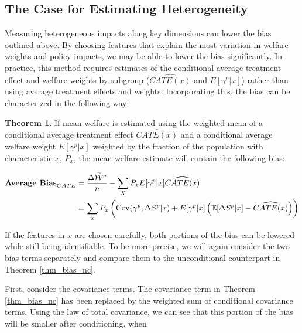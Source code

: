 \documentclass[12pt]{article}
\theoremstyle{definition}
\theoremstyle{definition}
\theoremstyle{definition}
\theoremstyle{definition}
\newtheorem{thm}{Theorem}
\begin{document}


\subsection{The Case for Estimating Heterogeneity}

 Measuring heterogeneous impacts along key dimensions can lower the bias outlined above. By choosing features that explain the most variation in welfare weights and policy impacts, we may be able to lower the bias significantly. In practice, this method requires estimates of the conditional average treatment effect and welfare weights by subgroup ($\widehat{CATE(x)}$ and $E[\gamma^p|x]$) rather than using average treatment effects and weights. Incorporating this, the bias can be characterized in the following way:

    \begin{thm}
    \label{thm_cond_bias}
       If mean welfare is estimated using the weighted mean of a conditional average treatment effect $\widehat{CATE(x)}$ and a conditional average welfare weight $E[\gamma^p|x]$ weighted by the fraction of the population with characteristic $x$, $P_x$,  the mean welfare estimate will contain the following bias: 
        
        \begin{align*}
        \textbf{Average Bias}_{CATE} &= \frac{\Delta \accentset{\sim}{\mathcal{W}}^p}{n} -  \sum_{X} P_x E[\gamma^p|x] \widehat{CATE(x)}  \\
       & = \sum_{x} P_x \left( \mathrm{Cov}(\gamma^p, \Delta S^p| x) + E[\gamma^p|x] \left( \mathbb{E}[\Delta S^p|x]-\widehat{CATE(x)} \right)\right)
    \end{align*}
    \end{thm}

    If the features in $x$ are chosen carefully, both portions of the bias can be lowered while still being identifiable. To be more precise, we will again consider the two bias terms separately and compare them to the unconditional counterpart in Theorem \ref{thm_bias_nc}. 

    First, consider the covariance terms. The covariance term in Theorem \ref{thm_bias_nc} has been replaced by the weighted sum of conditional covariance terms. Using the law of total covariance, we can see that this portion of the bias will be smaller after conditioning, when 
    
\end{document}
